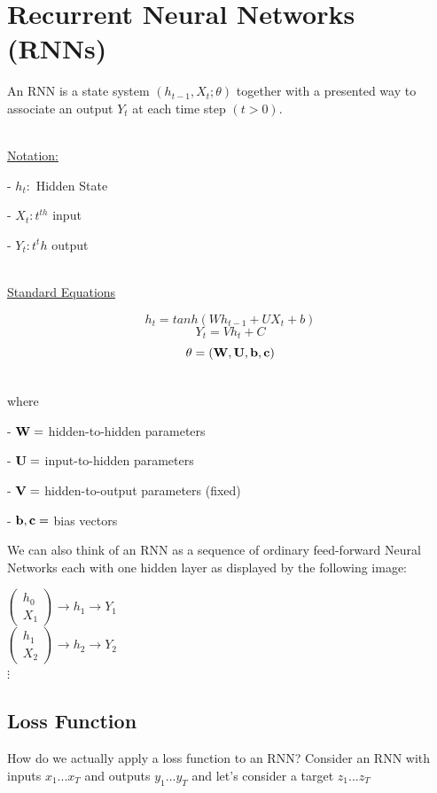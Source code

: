 \section{Recurrent Neural Networks (RNNs)}

An RNN is a state system $(h_{t-1}, X_t; \theta)$ together with a presented way to associate an output $Y_t$ at each time step $(t>0)$.

~\\\underline{Notation:}

- $h_t:$ Hidden State

- $X_t: t^{th}$ input 

- $Y_t: t^th$ output

~\\\underline{Standard Equations}

$$h_t = tanh(Wh_{t-1} + UX_{t} + b)$$
$$Y_t = Vh_t + C$$
$$\theta = (\MW, \MU, \vb,\vc)$$

~\\ where

- $\MW=$ hidden-to-hidden parameters

- $\MU=$ input-to-hidden parameters

- $ \MV=$ hidden-to-output parameters (fixed)

- $\vb,\vc =$ bias vectors

\noindent We can also think of an RNN as a sequence of ordinary feed-forward Neural Networks each with one hidden layer as displayed by the following image:

\begin{center}
$\begin{pmatrix}
 h_0\\
 X_1
\end{pmatrix} \longrightarrow	h_1 \longrightarrow	Y_1$\\
$\begin{pmatrix}
 h_1\\
 X_2
\end{pmatrix} \longrightarrow	h_2 \longrightarrow	Y_2$\\
  $\vdots$
\end{center}
\subsection{Loss Function}
How do we actually apply a loss function to an RNN? Consider an RNN with inputs $x_{1}...x_{T}$ and outputs $y_{1}...y_{T}$ and let's consider a target $z_{1}...z_{T}$ \\

